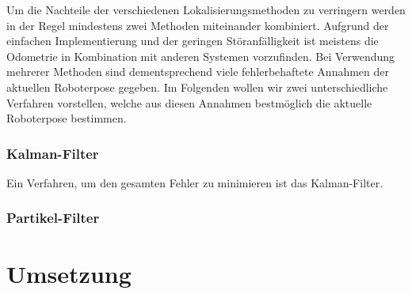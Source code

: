 Um die Nachteile der verschiedenen Lokalisierungsmethoden zu
 verringern werden in der Regel mindestens zwei Methoden miteinander
 kombiniert. Aufgrund der einfachen Implementierung und der geringen
 Störanfälligkeit ist meistens die Odometrie in Kombination mit
 anderen Systemen vorzufinden. Bei Verwendung mehrerer Methoden sind
 dementsprechend viele fehlerbehaftete Annahmen der aktuellen
 Roboterpose gegeben. Im Folgenden wollen wir zwei unterschiedliche
 Verfahren vorstellen, welche aus diesen Annahmen bestmöglich die
 aktuelle Roboterpose bestimmen.
 
\subsubsection{Kalman-Filter}
  Ein Verfahren, um den gesamten Fehler zu minimieren ist das
  Kalman-Filter.
\subsubsection{Partikel-Filter}
 
\section{Umsetzung}
\label{lokalisierung_umsetzung_sec}
\authorsection{\editordummy}

